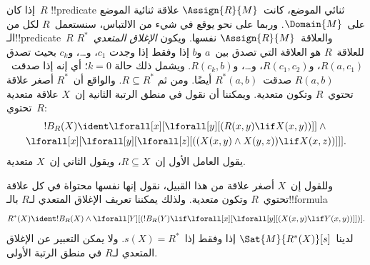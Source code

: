 \documentclass[../../../include/open-logic-section]{subfiles}
\begin{document}
\begin{ex}
إذا كان~$R$ !!{predicate} ثنائي الموضع، كانت~$\Assign{R}{M}$ علاقة
ثنائية الموضع على~$\Domain{M}$. وربما على نحو يوقع في شيء من الالتباس،
سنستعمل~$R$ لكل من الـ!!{predicate}~$R$ والعلاقة~$\Assign{R}{M}$
نفسها. ويكون \emph{الإغلاق المتعدي}~$R^*$ للعلاقة~$R$ هو العلاقة
التي تصدق بين~$a$ و$b$ إذا وفقط إذا وجدت
$c_1$، و\dots، و$c_k$ بحيث تصدق
$R(a,c_1)$، و$R(c_1, c_2)$، و\dots، و$R(c_k,b)$. ويشمل ذلك حالة
$k = 0$؛ أي إنه إذا صدقت~$R(a,b)$ صدقت~$R^*(a,b)$ أيضًا. ومن ثم
$R \subseteq R^*$. والواقع أن~$R^*$ أصغر علاقة تحتوي~$R$ وتكون
متعدية. ويمكننا أن نقول في منطق الرتبة الثانية إن~$X$ علاقة متعدية
تحتوي~$R$:
\begin{multline*}
  !B_R(X) \ident \lforall[x][\lforall[y][(R(x,y) \lif X(x, y))]] \land {}\\
\lforall[x][\lforall[y][\lforall[z][((X(x,y) \land X(y,z)) \lif X(x,
      z))]]].
\end{multline*}
يقول العامل الأول إن~$R \subseteq X$، ويقول الثاني إن~$X$ متعدية.

وللقول إن~$X$ أصغر علاقة من هذا القبيل، نقول إنها نفسها محتواة في كل
علاقة تحتوي~$R$ وتكون متعدية. ولذلك يمكننا تعريف الإغلاق المتعدي
لـ$R$ بالـ!!{formula}
\[
R^*(X) \ident !B_R(X) \land \lforall[Y][(!B_R(Y) \lif
  \lforall[x][\lforall[y][(X(x, y) \lif Y(x,y))]])].
\]
لدينا~$\Sat{M}{R^*(X)}[s]$ إذا وفقط إذا~$s(X) = R^*$. ولا يمكن
التعبير عن الإغلاق المتعدي لـ$R$ في منطق الرتبة الأولى.
\end{ex}
\end{document}
